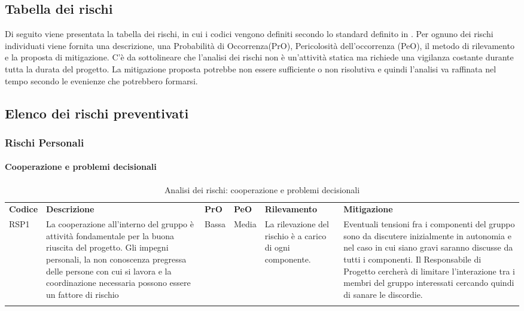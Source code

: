 \subsection{Tabella dei rischi}
Di seguito viene presentata la tabella dei rischi, in cui i codici vengono definiti secondo lo standard definito in .
Per ognuno dei rischi individuati viene fornita una descrizione, una Probabilità di Occorrenza(PrO), Pericolosità dell'occorrenza (PeO), il metodo di rilevamento e la proposta di mitigazione. C'è da sottolineare che l'analisi dei rischi non è un'attività statica ma richiede una vigilanza costante durante tutta la durata del progetto. La mitigazione proposta potrebbe non essere sufficiente o non risolutiva e quindi l'analisi va raffinata nel tempo secondo le evenienze che potrebbero formarsi.

\newpage
		
\subsection{Elenco dei rischi preventivati}

\subsubsection{Rischi Personali}
\paragraph{Cooperazione e problemi decisionali}
\begin{center}
	\begin{longtable}{p{1cm}|p{4cm}|p{0.7cm}|p{0.7cm}|p{3cm}|p{4cm}}
		\arrayrulecolor{lightest-grayest}
		\rowcolor{blue!20}
		\textbf{Codice} & 
		\textbf{Descrizione} &
		\textbf{PrO}  &
		\textbf{PeO}  &				        
		\textbf{Rilevamento} &
		\textbf{Mitigazione} \\	
		RSP1 & La cooperazione all'interno del gruppo è attività fondamentale per la buona riuscita del progetto. Gli impegni personali, la non conoscenza pregressa delle persone con cui si lavora e la coordinazione necessaria possono essere un fattore di rischio & Bassa & Media & La rilevazione del rischio è a carico di ogni componente. & Eventuali tensioni fra i componenti del gruppo sono da discutere inizialmente in autonomia e nel caso in cui siano gravi saranno discusse da tutti i componenti. Il Responsabile di Progetto cercherà di limitare l'interazione tra i membri del gruppo interessati cercando quindi di sanare le discordie. \\
		
		\rowcolor{white}
		\caption{Analisi dei rischi: cooperazione e problemi decisionali}
	\end{longtable}
\end{center}

